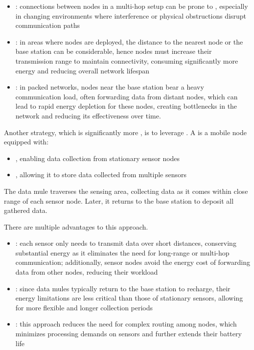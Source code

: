 \documentclass[a4paper, 12pt]{report}
\begin{document}
    \begin{itemize}
        \item {}: connections between nodes in a multi-hop setup can be prone to , especially in changing environments where interference or physical obstructions disrupt communication paths
        \item {}: in areas where nodes are  deployed, the distance to the nearest node or the base station can be considerable, hence nodes must increase their transmission range to maintain connectivity, consuming significantly more energy and reducing overall network lifespan
        \item {}: in  packed networks, nodes near the base station bear a heavy communication load, often forwarding data from distant nodes, which can lead to rapid energy depletion for these nodes, creating bottlenecks in the network and reducing its effectiveness over time.
    \end{itemize}

    Another strategy, which is significantly more , is to leverage . A  is a mobile node equipped with:

    \begin{itemize}
        \item {}, enabling data collection from stationary sensor nodes
        \item {}, allowing it to store data collected from multiple sensors
    \end{itemize}

    The data mule traverses the sensing area, collecting data as it comes within close range of each sensor node. Later, it returns to the base station to deposit all gathered data.

    There are multiple advantages to this approach.

    \begin{itemize}
        \item {}: each sensor only needs to transmit data over short distances, conserving substantial energy as it eliminates the need for long-range or multi-hop communication; additionally, sensor nodes avoid the energy cost of forwarding data from other nodes, reducing their workload
        \item {}: since data mules typically return to the base station to recharge, their energy limitations are less critical than those of stationary sensors, allowing for more flexible and longer collection periods
        \item {}: this approach reduces the need for complex routing among nodes, which minimizes processing demands on sensors and further extends their battery life
    \end{itemize}
\end{document}
